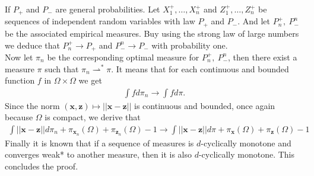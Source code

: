 {If $P_+$ and $P_-$ are general probabilities}. Let $X^+_1, \dots, X^+_n$ and $Z^+_1, \dots, Z^+_n$ be sequences of independent random variables with law $P_+$ and $P_-$. And let $P^+_n, \ P_-^n$ be the associated empirical measures. Buy using the strong law of large numbers we deduce that $P^+_n\rightarrow P_+$ and $ P_-^n\rightarrow P_-$ with probability one. 
\\ Now let $\pi_n$ be the corresponding optimal measure for $P^+_n, \ P_-^n$, then there exist a measure $\pi$ such that $\pi_n\rightharpoonup^* \pi$. It means that for each continuous and bounded function $f$ in $\Omega\times \Omega$ we get
\begin{align*}
\int f d\pi_n \longrightarrow \int f d\pi.
\end{align*}
Since the norm $(\textbf{x},\textbf{z})\mapsto ||\textbf{x}-\textbf{z} ||$ is continuous and bounded, once again because $\Omega$ is compact, we derive that 
\begin{align*}
\int||{\textbf{x}}-{{\textbf{z}}} ||d\pi_n + \pi_{\textbf{x}_n}(\Omega)+\pi_{{\textbf{z}}_n}(\Omega)-1 \longrightarrow \int||{\textbf{x}}-{{\textbf{z}}} ||d\pi + \pi_{\textbf{x}}(\Omega)+\pi_{{\textbf{z}}}(\Omega)-1
\end{align*}
Finally it is known that if a sequence of measures is $d$-cyclically monotone and converges weak* to another measure, then it is also $d$-cyclically monotone. This concludes the proof.

